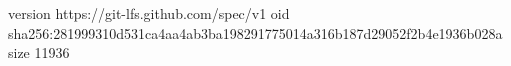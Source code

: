 version https://git-lfs.github.com/spec/v1
oid sha256:281999310d531ca4aa4ab3ba198291775014a316b187d29052f2b4e1936b028a
size 11936
